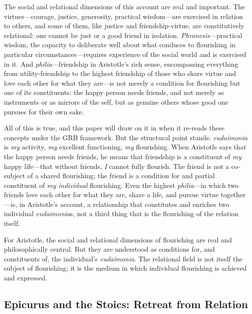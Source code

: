 The social and relational dimensions of this account are real and important. The virtues---courage, justice, generosity, practical wisdom---are exercised in relation to others, and some of them, like justice and friendship-virtue, are constitutively relational: one cannot be just or a good friend in isolation. \emph{Phronesis}---practical wisdom, the capacity to deliberate well about what conduces to flourishing in particular circumstances---requires experience of the social world and is exercised in it. And \emph{philia}---friendship in Aristotle's rich sense, encompassing everything from utility-friendship to the highest friendship of those who share virtue and love each other for what they are---is not merely a condition for flourishing but one of its constituents: the happy person needs friends, and not merely as instruments or as mirrors of the self, but as genuine others whose good one pursues for their own sake.

All of this is true, and this paper will draw on it in  when it re-reads these concepts under the GRB framework. But the structural point stands: \emph{eudaimonia} is \emph{my} activity, \emph{my} excellent functioning, \emph{my} flourishing. When Aristotle says that the happy person needs friends, he means that friendship is a constituent of \emph{my} happy life---that without friends, \emph{I} cannot fully flourish. The friend is not a co-subject of a shared flourishing; the friend is a condition for and partial constituent of \emph{my individual} flourishing. Even the highest \emph{philia}---in which two friends love each other for what they are, share a life, and pursue virtue together---is, in Aristotle's account, a relationship that constitutes and enriches two individual \emph{eudaimonia}s, not a third thing that is the flourishing of the relation itself.

\begin{claim}
For Aristotle, the social and relational dimensions of flourishing are real and philosophically central. But they are understood as conditions for, and constituents of, the individual's \emph{eudaimonia}. The relational field is not itself the subject of flourishing; it is the medium in which individual flourishing is achieved and expressed.
\end{claim}

\subsection{Epicurus and the Stoics: Retreat from Relation}
\label{p14:subsec:epicurusstoics}

